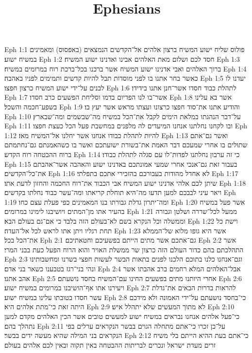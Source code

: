 

\title{Ephesians}

Eph 1:1  פולוס שליח ישוע המשיח ברצון אלהים אל־הקדשים הנמצאים (באפסוס) ומאמינים במשיח ישוע׃
Eph 1:2  חסד לכם ושלום מאת האלהים אבינו ואדנינו ישוע המשיח׃
Eph 1:3  ברוך האלהים ואבי אדנינו ישוע המשיח אשר ברכנו בכל־ברכת רוח במרומים במשיח׃
Eph 1:4  כאשר בחר אתנו בו לפני מוסדות תבל להיות קדשים ותמימים לפניו באהבה׃
Eph 1:5  יעדנו לו לבנים על־ידי ישוע המשיח כרצון חפצו׃
Eph 1:6  לתהלת כבוד חסדו אשר־חנן אתנו בידידו׃
Eph 1:7  אשר־בו לנו הפדיום בדמו וסליחת הפשעים כרב חסדו׃
Eph 1:8  אשר בא עלינו בשפע־חכמה והשכל׃
Eph 1:9  והודיע אתנו את־סוד חפצו כרצונו ועצתו מראש אשר יעץ בו׃
Eph 1:10  על־דבר הנהגתו במלאת הימים לקבל את־הכל במשיח מה־שבשמים ומה־שבארץ׃
Eph 1:11  ובו לקחנו נחלתנו אנחנו המיעדים לה מלפנים במחשבת פעל הכל כעצת חפצו׃
Eph 1:12  להיות לתהלת כבודו אנחנו אשר יחלנו אל־המשיח מאז׃
Eph 1:13  ואשר גם־אתם שתולים בו אחרי שמעכם דבר האמת את־בשורת ישועתכם ואשר בו כשהאמנתם גם־נחתמתם ברוח ההבטחה רוח הקדש׃
Eph 1:14  כי זה ערבון נחלתנו לפדות־לו עם סגלה לתהלת כבודו׃
Eph 1:15  בעבור זאת גם־אנכי אחרי שמעי אמונתכם באדנינו ישוע והאהבה אשר־אהבתם את־כל־הקדשים׃
Eph 1:16  לא אחדל מהודות בעבורכם בהזכירי אתכם בתפלתי׃
Eph 1:17  שיתן לכם אלהי אדנינו ישוע המשיח אבי הכבוד את־רוח החכמה והחזון לדעת אתו׃
Eph 1:18  ויאר עיני לבבכם למען תדעו מה־היא תוחלת קריאתו ומה־עשר כבוד נחלתו בקדשים׃
Eph 1:19  ומה־יתרון גדלת גבורתו בנו המאמינים כפי פעלת עצם כחו׃
Eph 1:20  אשר פעל במשיח בהעיר אתו מן־המתים ויושיבנו לימינו במרומים׃
Eph 1:21  ממעל לכל־שררה ושלטן וגבורה וממשלה וכל הנקרא בשם לא־בעולם הזה בלבד כי אם־גם בעולם הבא׃
Eph 1:22  וישת כל תחת רגליו ויתן אתו לראש לכל אל־העדה׃
Eph 1:23  אשר היא גופו מלוא של־הממלא את־הכל בכל׃
Eph 2:1  גם־אתכם אשר מתים הייתם בפשעיכם וחטאתיכם׃
Eph 2:2  אשר התהלכתם בהם כדור העולם הזה כרצון שר ממשלת האויר והוא הרוח הפעל כעת בבני המרי׃
Eph 2:3  וגם־אנחנו כלנו בתוכם הלכנו לפנים בתאות הבשר לעשות חפצי בשרנו ומחשבותינו ונהי בני־רגז בטבענו כשאר בני אדם׃
Eph 2:4  אבל־האלהים המלא רחמים ברב אהבתו אשר אהב אתנו׃
Eph 2:5  אחרי היותנו מתים בפשעים החינו עם־המשיח בחסד נושעתם׃
Eph 2:6  ויעירנו אתו אף־הושיבנו במרומים במשיח ישוע׃
Eph 2:7  להראות בדרות הבאים את־גדלת עשר חסדו בטובתו עלינו במשיח ישוע׃
Eph 2:8  כי־בחסד נושעתם על־ידי האמונה ולא מידכם היתה זאת כי־מתת אלהים היא׃
Eph 2:9  לא מתוך המעשים שלא יתהלל איש׃
Eph 2:10  כי־פעל אלהים אנחנו נבראים במשיח ישוע למעשים טובים אשר הכין האלהים מקדם למען נתהלך בהם׃
Eph 2:11  על־כן זכרו כי־אתם מתחלה הגוים בבשר הנקראים ערלים בפי הנקראים בני המילה שהיא מעשה ידים בבשר׃
Eph 2:12  כי־אתם בעת ההיא הייתם בלי משיח זרים מעדת ישראל ונכרים לבריתות ההבטחה באין תקוה ובאין לכם אלהים בעולם׃
